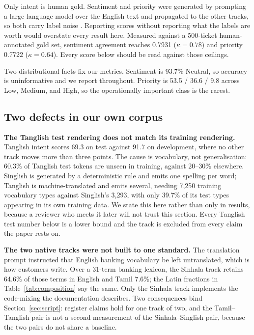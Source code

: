 Only intent is human gold. Sentiment and priority were generated by prompting a
large language model over the English text and propagated to the other tracks,
so both carry label noise \cite{northcutt2021labelerrors}. Reporting scores
without reporting what the labels are worth would overstate every result here.
Measured against a 500-ticket human-annotated gold set, sentiment agreement
reaches 0.7931 \negf{} ($\kappa=0.78$) and priority 0.7722 \macrof{}
($\kappa=0.64$). Every score below should be read against those ceilings.

Two distributional facts fix our metrics. Sentiment is 93.7\% Neutral, so
accuracy is uninformative and we report \negf{} throughout. Priority is
53.5 / 36.6 / 9.8 across Low, Medium, and High, so the operationally important
class is the rarest.

\subsection{Two defects in our own corpus}

\textbf{The Tanglish test rendering does not match its training rendering.}
Tanglish intent scores 69.3 \macrof{} on test against 91.7 on development, where
no other track moves more than three points. The cause is vocabulary, not
generalisation: 60.3\% of Tanglish test tokens are unseen in training, against
20--30\% elsewhere. Singlish is generated by a deterministic rule and emits one
spelling per word; Tanglish is machine-translated and emits several, needing
7{,}250 training vocabulary types against Singlish's 3{,}293, with only 39.7\%
of its test types appearing in its own training data. We state this here rather
than only in results, because a reviewer who meets it later will not trust this
section. Every Tanglish test number below is a lower bound and the track is
excluded from every claim the paper rests on.

\textbf{The two native tracks were not built to one standard.} The translation
prompt instructed that English banking vocabulary be left untranslated, which is
how customers write. Over a 31-term banking lexicon, the Sinhala track retains
64.6\% of those terms in English and Tamil 7.6\%; the Latin fractions in
Table~\ref{tab:composition} say the same. Only the Sinhala track implements the
code-mixing the documentation describes. Two consequences bind
Section~\ref{sec:script}: register claims hold for one track of two, and the
Tamil--Tanglish pair is not a second measurement of the Sinhala--Singlish pair,
because the two pairs do not share a baseline.
